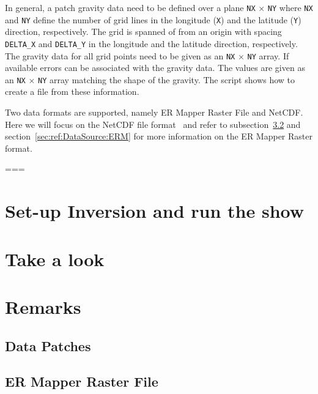 In general, a patch gravity data need to be defined over a plane \verb|NX| $\times$ \verb|NY| where 
\verb|NX|  and \verb|NY|  define the number of grid lines in the longitude (\verb|X|) and the latitude (\verb|Y|) 
direction, respectively. The grid is spanned of from an origin with spacing
\verb|DELTA_X| and \verb|DELTA_Y| in the longitude and the latitude direction, respectively. 
The gravity data for all grid points need to be given as an \verb|NX| $\times$ \verb|NY| array.  
If available errors can be associated with the gravity data. The values are given as an \verb|NX| $\times$ \verb|NY| array
matching the shape of the gravity. 
The script  shows how to create a \netcdf file from these information.


Two data formats are supported, namely ER Mapper Raster File and NetCDF. Here we will
focus on the NetCDF file format~\cite{NETCDF} and refer to subsection~\ref{SEC:P1:GRAV:REMARK:ERMAPPER} and
section~\ref{sec:ref:DataSource:ERM} for more information on the ER Mapper Raster format.

===




\section{Set-up Inversion and run the show}

\section{Take a look}

\section{Remarks}

\subsection{Data Patches}\label{SEC:P1:GRAV:REMARK:DATA2}

\subsection{ER Mapper Raster File}\label{SEC:P1:GRAV:REMARK:ERMAPPER}


